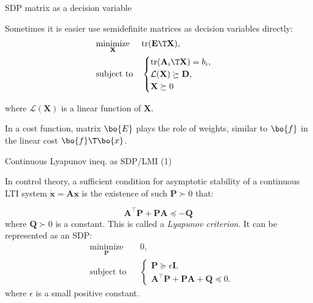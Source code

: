 \documentclass{beamer}
\begin{document}
\begin{frame}{SDP matrix as a decision variable}
\begin{flushleft}

Sometimes it is easier use semidefinite matrices as decision variables directly:
%
\begin{equation}
\begin{aligned}
& \underset{\mathbf{X}}{\text{minimize}}
& & \text{tr}(\mathbf{E}\T \mathbf{X}), \\
& \text{subject to}
& & \begin{cases}
     \text{tr}(\mathbf{A}_i\T\mathbf{X}) = b_i, \\
     \mathcal{L}(\mathbf{X}) \succeq \mathbf{D}, \\
     \mathbf{X} \succeq 0
    \end{cases}
\end{aligned}
\end{equation}

where $ \mathcal{L}(\mathbf{X})$ is a linear function of $\mathbf{X}$.

\bigskip

In a cost function, matrix $\bo{E}$ plays the role of weights, similar to $\bo{f}$ in the linear cost $\bo{f}\T \bo{x}$. 

\end{flushleft}
\end{frame}






\begin{frame}{Continuous Lyapunov ineq. as SDP/LMI (1)}
	\begin{flushleft}
		
		In control theory, a sufficient condition for asymptotic stability of a continuous LTI system $\dot{\mathbf{x}} = \mathbf{A}\mathbf{x}$ is the existence of such $\mathbf{P} \succ 0$ that:
		
		\begin{equation}
			\mathbf{A}^\top\mathbf{P} + \mathbf{P}\mathbf{A}  \preceq -\mathbf{Q}
		\end{equation}
		where $\mathbf{Q} \succ 0$ is a constant. This is called a \emph{Lyapunov criterion}. It can be represented as an SDP:
		\begin{equation}
			\begin{aligned}
				& \underset{\mathbf{P}}{\text{minimize}}
				& & 0, \\
				& \text{subject to}
				& & \begin{cases}
					\mathbf{P} \succeq \epsilon \mathbf{I}, \\
					\mathbf{A}^\top\mathbf{P} + \mathbf{P}\mathbf{A} + \mathbf{Q} \preceq 0.
				\end{cases}
			\end{aligned}
		\end{equation}
		where $\epsilon$ is a small positive constant.
		
	\end{flushleft}
\end{frame}
\end{document}
